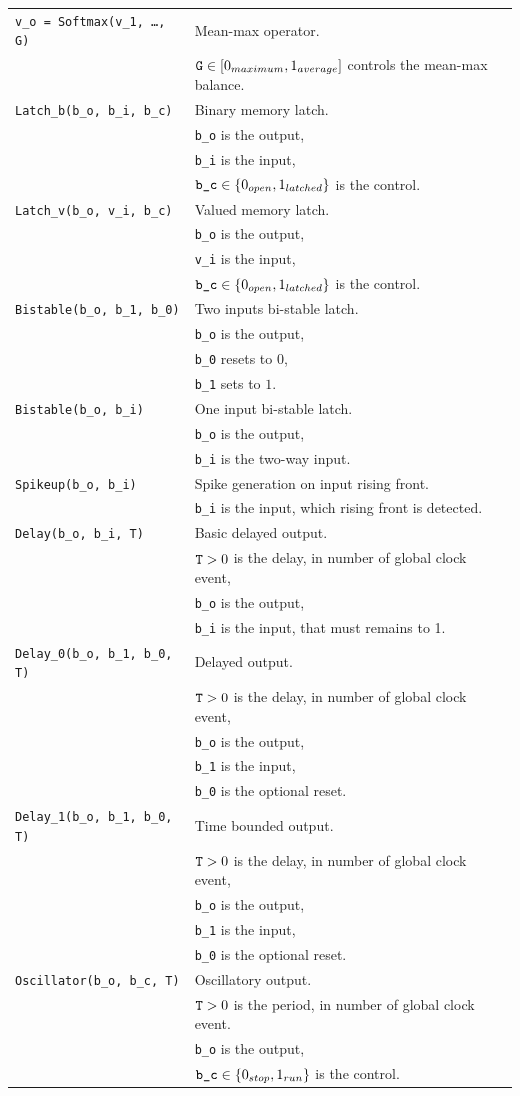\documentclass[a4]{article} \usepackage[left=2cm,right=3cm,top=1cm,bottom=2cm]{geometry}
\begin{document}
{\begin{tabular}{ll}
  {\tt v\_o = Softmax(v\_1, …, G)} & Mean-max operator. \\ & $\mbox{{\tt G}} \in [0_{maximum}, 1_{average}]$ controls the mean-max balance.\\
  {\tt Latch\_b(b\_o, b\_i, b\_c)} & Binary memory latch. \\& {\tt b\_o} is the  output, \\& {\tt b\_i} is the input,  \\& $\mbox{{\tt b\_c}} \in \{0_{open}, 1_{latched}\}$ is the control. \\
  {\tt Latch\_v(b\_o, v\_i, b\_c)} & Valued memory latch. \\& {\tt b\_o} is the  output, \\& {\tt v\_i} is the input,  \\& $\mbox{{\tt b\_c}} \in \{0_{open}, 1_{latched}\}$ is the control. \\
  {\tt Bistable(b\_o, b\_1, b\_0)} & Two inputs bi-stable latch. \\& {\tt b\_o} is the  output, \\& {\tt b\_0} resets to $0$, \\& {\tt b\_1} sets to $1$. \\
  {\tt Bistable(b\_o, b\_i)} & One input bi-stable latch. \\& {\tt b\_o} is the  output, \\& {\tt b\_i} is the two-way input.\\
  {\tt Spikeup(b\_o, b\_i)} & Spike generation on input rising front. \\& {\tt b\_i} is the input, which rising front is detected.\\
  {\tt Delay(b\_o, b\_i, T)} & Basic delayed output. \\& $\mbox{{\tt T}} > 0$ is the delay, in number of global clock event, \\& {\tt b\_o} is the  output, \\& {\tt b\_i} is the input, that must  remains to 1.\\
  {\tt Delay\_0(b\_o, b\_1, b\_0, T)} & Delayed output. \\& $\mbox{{\tt T}} > 0$ is the delay, in number of global clock event, \\& {\tt b\_o} is the  output, \\& {\tt b\_1} is the input, \\& {\tt b\_0} is the optional reset.\\
  {\tt Delay\_1(b\_o, b\_1, b\_0, T)} & Time bounded output. \\& $\mbox{{\tt T}} > 0$ is the delay, in number of global clock event, \\& {\tt b\_o} is the  output, \\& {\tt b\_1} is the input, \\& {\tt b\_0} is the optional reset.\\
  {\tt Oscillator(b\_o, b\_c, T)} & Oscillatory output. \\& $\mbox{{\tt T}} > 0$ is the period, in number of global clock event. \\& {\tt b\_o} is the  output, \\& $\mbox{{\tt b\_c}} \in \{0_{stop}, 1_{run}\}$ is the control.\\
\end{tabular}}
\end{document}
